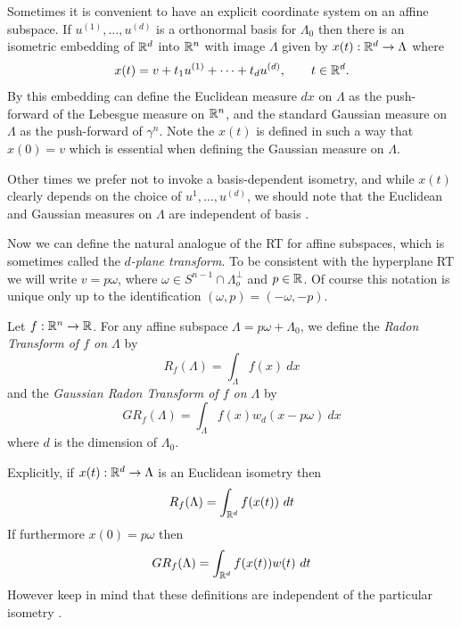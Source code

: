 Sometimes it is convenient to have an explicit coordinate system on an affine subspace. If $u^{(1)}, \ldots, u^{(d)}$ is a orthonormal basis for $\Lambda_0$ then there is an isometric embedding of $\mathbb{R}^d$ into $\mathbb{R}^n$ with image $\Lambda$ given by $x(t) : \mathbb{R}^d \rightarrow \Lambda$ where
\[
  x(t) = v + t_1u^{(1)} + \cdots + t_d u^{(d)}, \qquad t \in \mathbb{R}^d.
\]
By this embedding can define the Euclidean measure $dx$ on $\Lambda$ as the push-forward of the Lebesgue measure on $\mathbb{R}^n$, and the standard Gaussian measure on $\Lambda$ as the push-forward of $\gamma^n$. Note the $x(t)$ is defined in such a way that $x(0) = v$ which is essential when defining the Gaussian measure on $\Lambda$.

Other times we prefer not to invoke a basis-dependent isometry, and while $x(t)$ clearly depends on the choice of $u^{1}, \ldots, u^{(d)}$, we should note that the Euclidean and Gaussian measures on $\Lambda$ are independent of basis \pn.


Now we can define the natural analogue of the RT for affine subspaces, which is sometimes called the \emph{$d$-plane transform}. To be consistent with the hyperplane RT we will write $v = p\omega$, where $\omega \in S^{n-1} \cap \Lambda_o^\perp$ and $p \in \mathbb{R}$. Of course this notation is unique only up to the identification $(\omega, p) = (-\omega, -p)$.

\begin{definition}
  Let $f:\mathbb{R}^n \rightarrow \mathbb{R}$. For any affine subspace $\Lambda = p\omega + \Lambda_0$, we define the \emph{Radon Transform of $f$ on $\Lambda$} by
  \[
    R_f(\Lambda) = \int_{\Lambda} f(x)~dx
  \]
  and the \emph{Gaussian Radon Transform of $f$ on $\Lambda$} by 
  \[
    GR_f(\Lambda) = \int_{\Lambda} f(x) w_d(x - p\omega) ~dx
  \]
  where $d$ is the dimension of $\Lambda_0$.
\end{definition}
\begin{remark}
  Explicitly, if $x(t): \mathbb{R}^d \rightarrow \Lambda$ is an Euclidean isometry then 
  \[
    R_f(\Lambda) = \int_{\mathbb{R}^d} f(x(t))~dt
  \]
  If furthermore $x(0) = p\omega$ then
  \[
    GR_f(\Lambda) = \int_{\mathbb{R}^d} f(x(t))w(t)~dt
  \]
  However keep in mind that these definitions are independent of the particular isometry \pn.
\end{remark}

